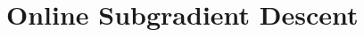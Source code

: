 \documentclass[../main]{subfiles}
\begin{document}
\newcommand*{\CurrentChapter}{02}
\setcounter{chapter}{1}
\chapter{Online Subgradient Descent}





\end{document}
